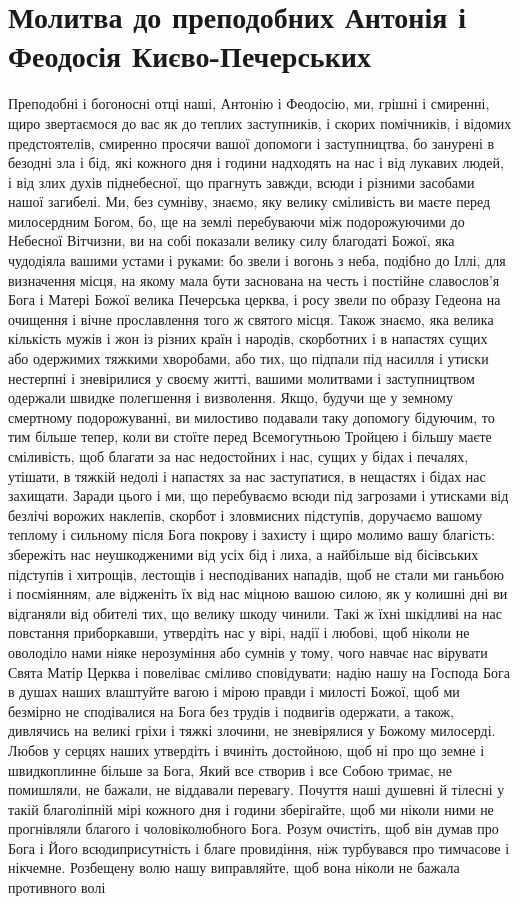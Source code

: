 \documentclass[chapters.tex]{subfiles}
\begin{document}
\section{Молитва до преподобних Антонія і Феодосія Києво-Печерських}
Преподобні і богоносні отці наші, Антонію і Феодосію, ми, грішні і смиренні, щиро звертаємося до вас як до теплих заступників, і скорих помічників, і відомих предстоятелів, смиренно просячи вашої допомоги і заступництва, бо занурені в безодні зла і бід, які кожного дня і години надходять на нас і від лукавих людей, і від злих духів піднебесної, що прагнуть завжди, всюди і різними засобами нашої загибелі. Ми, без сумніву, знаємо, яку велику сміливість ви маєте перед милосердним Богом, бо, ще на землі перебуваючи між подорожуючими до Небесної Вітчизни, ви на собі показали велику силу благодаті Божої, яка чудодіяла вашими устами і руками: бо звели і вогонь з неба, подібно до Іллі, для визначення місця, на якому мала бути заснована на честь і постійне славослов’я Бога і Матері Божої велика Печерська церква, і росу звели по образу Гедеона на очищення і вічне прославлення того ж святого місця. Також знаємо, яка велика кількість мужів і жон із різних країн і народів, скорботних і в напастях сущих або одержимих тяжкими хворобами, або тих, що підпали під насилля і утиски нестерпні і зневірилися у своєму житті, вашими молитвами і заступництвом одержали швидке полегшення і визволення. Якщо, будучи ще у земному смертному подорожуванні, ви милостиво подавали таку допомогу бідуючим, то тим більше тепер, коли ви стоїте перед Всемогутньою Тройцею і більшу маєте сміливість, щоб благати за нас недостойних і нас, сущих у бідах і печалях, утішати, в тяжкій недолі і напастях за нас заступатися, в нещастях і бідах нас захищати. Заради цього і ми, що перебуваємо всюди під загрозами і утисками від безлічі ворожих наклепів, скорбот і зловмисних підступів, доручаємо вашому теплому і сильному після Бога покрову і захисту і щиро молимо вашу благість: збережіть нас неушкодженими від усіх бід і лиха, а найбільше від бісівських підступів і хитрощів, лестощів і несподіваних нападів, щоб не стали ми ганьбою і посміянням, але відженіть їх від нас міцною вашою силою, як у колишні дні ви відганяли від обителі тих, що велику шкоду чинили. Такі ж їхні шкідливі на нас повстання приборкавши, утвердіть нас у вірі, надії і любові, щоб ніколи не оволоділо нами ніяке нерозуміння або сумнів у тому, чого навчає нас вірувати Свята Матір Церква і повеліває сміливо сповідувати; надію нашу на Господа Бога в душах наших влаштуйте вагою і мірою правди і милості Божої, щоб ми безмірно не сподівалися на Бога без трудів і подвигів одержати, а також, дивлячись на великі гріхи і тяжкі злочини, не зневірялися у Божому милосерді. Любов у серцях наших утвердіть і вчиніть достойною, щоб ні про що земне і швидкоплинне більше за Бога, Який все створив і все Собою тримає, не помишляли, не бажали, не віддавали перевагу. Почуття наші душевні й тілесні у такій благоліпній мірі кожного дня і години зберігайте, щоб ми ніколи ними не прогнівляли благого і чоловіколюбного Бога. Розум очистіть, щоб він думав про Бога і Його всюдиприсутність і благе провидіння, ніж турбувався про тимчасове і нікчемне. Розбещену волю нашу виправляйте, щоб вона ніколи не бажала противного волі 
\end{document}
